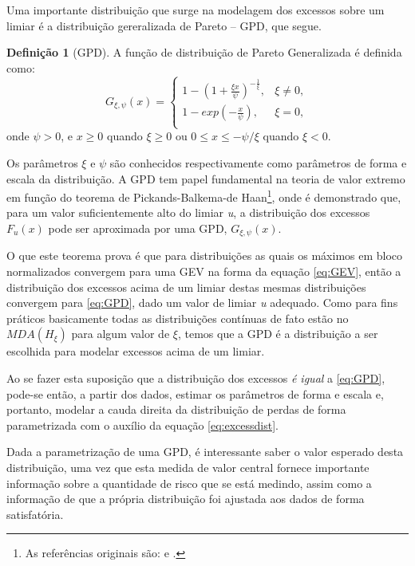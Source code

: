 \documentclass[1p]{elsarticle}
\theoremstyle{definition}
\newtheorem{defi}[teor]{Definição}
\begin{document}
Uma importante distribuição que surge na modelagem dos excessos sobre um limiar é a distribuição gereralizada de Pareto – GPD, que segue.

\begin{defi}[GPD] \label{defi:GPD}
	A função de distribuição de Pareto Generalizada é definida como:
	\begin{equation}
	\label{eq:GPD}
	G_{\xi,\psi}(x) = 
	\begin{cases}
	1- \left(1+ \frac{\xi x}{\psi} \right)^{-\frac{1}{\xi}}, & \xi \neq 0,\\
	1-exp\left(-\frac{x}{\psi}\right), & \xi = 0,\\
	\end{cases}
	\end{equation}
	onde $\psi > 0$, e $x\geq 0$ quando $\xi  \geq 0$ ou $0 \leq x \leq -\psi / \xi$ quando $\xi < 0$.
\end{defi}

Os parâmetros $\xi$ e $\psi$ são conhecidos respectivamente como parâmetros de forma e escala da distribuição. A GPD tem papel fundamental na teoria de valor extremo em função do teorema de Pickands-Balkema-de Haan\footnote{As referências originais são: \cite{Pickands1975} e \cite{Balkema1974}.}, onde é demonstrado que, para um valor suficientemente alto do limiar \emph{u}, a distribuição dos excessos $F_u(x)$ pode ser aproximada por uma GPD, $G_{\xi,\psi}(x)$.

O que este teorema prova é que para distribuições as quais os máximos em bloco normalizados convergem para uma GEV na forma da equação \eqref{eq:GEV}, então a distribuição dos excessos acima de um limiar destas mesmas distribuições convergem para \eqref{eq:GPD}, dado um valor de limiar \emph{u} adequado. Como para fins práticos basicamente todas as distribuições contínuas de fato estão no $MDA(H_\xi)$ para algum valor de $\xi$, temos que a GPD é a distribuição a ser escolhida para modelar excessos acima de um limiar.

Ao se fazer esta suposição que a distribuição dos excessos \emph{é igual} a \eqref{eq:GPD}, pode-se então, a partir dos dados, estimar os parâmetros de forma e escala e, portanto, modelar a cauda direita da distribuição de perdas de forma parametrizada com o auxílio da equação \eqref{eq:excessdist}. 


Dada a parametrização de uma GPD, é interessante saber o valor esperado desta distribuição, uma vez que esta medida de valor central fornece importante informação sobre a quantidade de risco que se está medindo, assim como a informação de que a própria distribuição foi ajustada aos dados de forma satisfatória.
\end{document}
